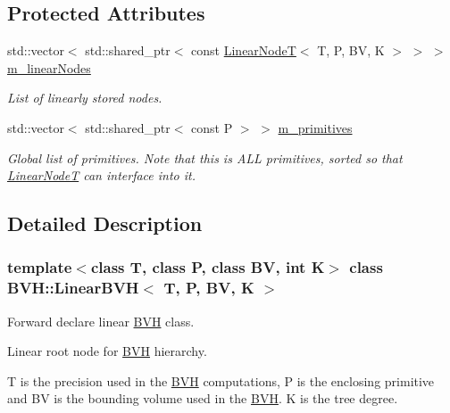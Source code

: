 \subsection*{Protected Attributes}
\begin{DoxyCompactItemize}
\item 
\mbox{\label{classBVH_1_1LinearBVH_ac11af18884c0568f3067ef12c7f53e39}} 
std\+::vector$<$ std\+::shared\+\_\+ptr$<$ const \hyperlink{classBVH_1_1LinearNodeT}{Linear\+NodeT}$<$ T, P, BV, K $>$ $>$ $>$ \hyperlink{classBVH_1_1LinearBVH_ac11af18884c0568f3067ef12c7f53e39}{m\+\_\+linear\+Nodes}
\begin{DoxyCompactList}\small\item\em List of linearly stored nodes. \end{DoxyCompactList}\item 
\mbox{\label{classBVH_1_1LinearBVH_aa4f627615c40d7230139ec1744384322}} 
std\+::vector$<$ std\+::shared\+\_\+ptr$<$ const P $>$ $>$ \hyperlink{classBVH_1_1LinearBVH_aa4f627615c40d7230139ec1744384322}{m\+\_\+primitives}
\begin{DoxyCompactList}\small\item\em Global list of primitives. Note that this is A\+LL primitives, sorted so that \hyperlink{classBVH_1_1LinearNodeT}{Linear\+NodeT} can interface into it. \end{DoxyCompactList}\end{DoxyCompactItemize}


\subsection{Detailed Description}
\subsubsection*{template$<$class T, class P, class BV, int K$>$\newline
class B\+V\+H\+::\+Linear\+B\+V\+H$<$ T, P, B\+V, K $>$}

Forward declare linear \hyperlink{namespaceBVH}{B\+VH} class. 

Linear root node for \hyperlink{namespaceBVH}{B\+VH} hierarchy.

T is the precision used in the \hyperlink{namespaceBVH}{B\+VH} computations, P is the enclosing primitive and BV is the bounding volume used in the \hyperlink{namespaceBVH}{B\+VH}. K is the tree degree. 

